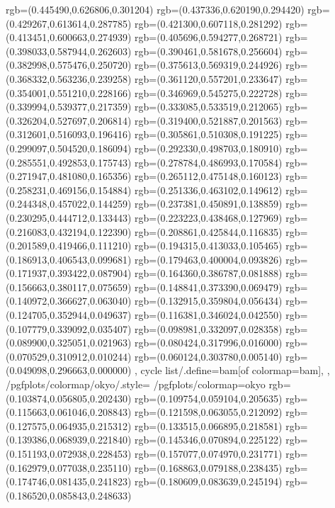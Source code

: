 {{{			rgb=(0.445490,0.626806,0.301204)
			rgb=(0.437336,0.620190,0.294420)
			rgb=(0.429267,0.613614,0.287785)
			rgb=(0.421300,0.607118,0.281292)
			rgb=(0.413451,0.600663,0.274939)
			rgb=(0.405696,0.594277,0.268721)
			rgb=(0.398033,0.587944,0.262603)
			rgb=(0.390461,0.581678,0.256604)
			rgb=(0.382998,0.575476,0.250720)
			rgb=(0.375613,0.569319,0.244926)
			rgb=(0.368332,0.563236,0.239258)
			rgb=(0.361120,0.557201,0.233647)
			rgb=(0.354001,0.551210,0.228166)
			rgb=(0.346969,0.545275,0.222728)
			rgb=(0.339994,0.539377,0.217359)
			rgb=(0.333085,0.533519,0.212065)
			rgb=(0.326204,0.527697,0.206814)
			rgb=(0.319400,0.521887,0.201563)
			rgb=(0.312601,0.516093,0.196416)
			rgb=(0.305861,0.510308,0.191225)
			rgb=(0.299097,0.504520,0.186094)
			rgb=(0.292330,0.498703,0.180910)
			rgb=(0.285551,0.492853,0.175743)
			rgb=(0.278784,0.486993,0.170584)
			rgb=(0.271947,0.481080,0.165356)
			rgb=(0.265112,0.475148,0.160123)
			rgb=(0.258231,0.469156,0.154884)
			rgb=(0.251336,0.463102,0.149612)
			rgb=(0.244348,0.457022,0.144259)
			rgb=(0.237381,0.450891,0.138859)
			rgb=(0.230295,0.444712,0.133443)
			rgb=(0.223223,0.438468,0.127969)
			rgb=(0.216083,0.432194,0.122390)
			rgb=(0.208861,0.425844,0.116835)
			rgb=(0.201589,0.419466,0.111210)
			rgb=(0.194315,0.413033,0.105465)
			rgb=(0.186913,0.406543,0.099681)
			rgb=(0.179463,0.400004,0.093826)
			rgb=(0.171937,0.393422,0.087904)
			rgb=(0.164360,0.386787,0.081888)
			rgb=(0.156663,0.380117,0.075659)
			rgb=(0.148841,0.373390,0.069479)
			rgb=(0.140972,0.366627,0.063040)
			rgb=(0.132915,0.359804,0.056434)
			rgb=(0.124705,0.352944,0.049637)
			rgb=(0.116381,0.346024,0.042550)
			rgb=(0.107779,0.339092,0.035407)
			rgb=(0.098981,0.332097,0.028358)
			rgb=(0.089900,0.325051,0.021963)
			rgb=(0.080424,0.317996,0.016000)
			rgb=(0.070529,0.310912,0.010244)
			rgb=(0.060124,0.303780,0.005140)
			rgb=(0.049098,0.296663,0.000000)
		},
	cycle list/.define={bam}{[of colormap=bam]},
	},
	/pgfplots/colormap/okyo/.style={
		/pgfplots/colormap={okyo}{%
			rgb=(0.103874,0.056805,0.202430)
			rgb=(0.109754,0.059104,0.205635)
			rgb=(0.115663,0.061046,0.208843)
			rgb=(0.121598,0.063055,0.212092)
			rgb=(0.127575,0.064935,0.215312)
			rgb=(0.133515,0.066895,0.218581)
			rgb=(0.139386,0.068939,0.221840)
			rgb=(0.145346,0.070894,0.225122)
			rgb=(0.151193,0.072938,0.228453)
			rgb=(0.157077,0.074970,0.231771)
			rgb=(0.162979,0.077038,0.235110)
			rgb=(0.168863,0.079188,0.238435)
			rgb=(0.174746,0.081435,0.241823)
			rgb=(0.180609,0.083639,0.245194)
			rgb=(0.186520,0.085843,0.248633)
}}}
